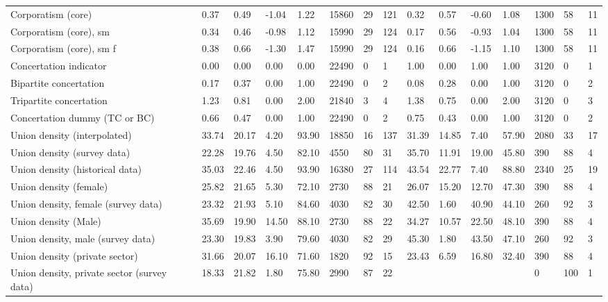 \begin{longtable}{lllllllllllllll}
Corporatism (core) & 0.37 & 0.49 & -1.04 & 1.22 & 15860 & 29 & 121 & 0.32 & 0.57 & -0.60 & 1.08 & 1300 & 58 & 11\\
\addlinespace
Corporatism (core), sm & 0.34 & 0.46 & -0.98 & 1.12 & 15990 & 29 & 124 & 0.17 & 0.56 & -0.93 & 1.04 & 1300 & 58 & 11\\
Corporatism (core), sm f & 0.38 & 0.66 & -1.30 & 1.47 & 15990 & 29 & 124 & 0.16 & 0.66 & -1.15 & 1.10 & 1300 & 58 & 11\\
Concertation indicator & 0.00 & 0.00 & 0.00 & 0.00 & 22490 & 0 & 1 & 1.00 & 0.00 & 1.00 & 1.00 & 3120 & 0 & 1\\
Bipartite concertation & 0.17 & 0.37 & 0.00 & 1.00 & 22490 & 0 & 2 & 0.08 & 0.28 & 0.00 & 1.00 & 3120 & 0 & 2\\
Tripartite concertation & 1.23 & 0.81 & 0.00 & 2.00 & 21840 & 3 & 4 & 1.38 & 0.75 & 0.00 & 2.00 & 3120 & 0 & 3\\
\addlinespace
Concertation dummy (TC or BC) & 0.66 & 0.47 & 0.00 & 1.00 & 22490 & 0 & 2 & 0.75 & 0.43 & 0.00 & 1.00 & 3120 & 0 & 2\\
Union density (interpolated) & 33.74 & 20.17 & 4.20 & 93.90 & 18850 & 16 & 137 & 31.39 & 14.85 & 7.40 & 57.90 & 2080 & 33 & 17\\
Union density (survey data) & 22.28 & 19.76 & 4.50 & 82.10 & 4550 & 80 & 31 & 35.70 & 11.91 & 19.00 & 45.80 & 390 & 88 & 4\\
Union density (historical data) & 35.03 & 22.46 & 4.50 & 93.90 & 16380 & 27 & 114 & 43.54 & 22.77 & 7.40 & 88.80 & 2340 & 25 & 19\\
Union density (female) & 25.82 & 21.65 & 5.30 & 72.10 & 2730 & 88 & 21 & 26.07 & 15.20 & 12.70 & 47.30 & 390 & 88 & 4\\
\addlinespace
Union density, female (survey data) & 23.32 & 21.93 & 5.10 & 84.60 & 4030 & 82 & 30 & 42.50 & 1.60 & 40.90 & 44.10 & 260 & 92 & 3\\
Union density (Male) & 35.69 & 19.90 & 14.50 & 88.10 & 2730 & 88 & 22 & 34.27 & 10.57 & 22.50 & 48.10 & 390 & 88 & 4\\
Union density, male (survey data) & 23.30 & 19.83 & 3.90 & 79.60 & 4030 & 82 & 29 & 45.30 & 1.80 & 43.50 & 47.10 & 260 & 92 & 3\\
Union density (private sector) & 31.66 & 20.07 & 16.10 & 71.60 & 1820 & 92 & 15 & 23.43 & 6.59 & 16.80 & 32.40 & 390 & 88 & 4\\
Union density, private sector (survey data) & 18.33 & 21.82 & 1.80 & 75.80 & 2990 & 87 & 22 &  &  &  &  & 0 & 100 & 1\\

\end{longtable}
